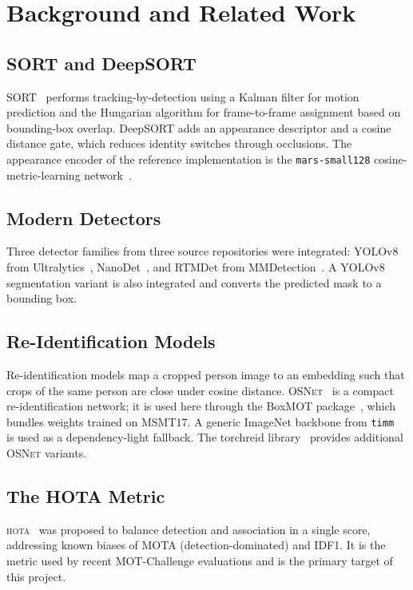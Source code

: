 \documentclass[12pt, a4paper]{article}
\newcommand{\hota}{\textsc{hota}}
\newcommand{\osnet}{\textsc{OSNet}}
\begin{document}
\section{Background and Related Work}
\label{sec:background}

\subsection{SORT and DeepSORT}
SORT~\cite{bewley2016sort} performs tracking-by-detection using a Kalman filter for motion prediction
and the Hungarian algorithm for frame-to-frame assignment based on bounding-box overlap. DeepSORT
\cite{wojke2017deepsort} adds an appearance descriptor and a cosine distance gate, which reduces
identity switches through occlusions. The appearance encoder of the reference implementation is the
\texttt{mars-small128} cosine-metric-learning network~\cite{wojke2018cosine}.

\subsection{Modern Detectors}
Three detector families from three source repositories were integrated: YOLOv8 from
Ultralytics~\cite{jocher2023yolov8}, NanoDet~\cite{rangilyu2021nanodet}, and RTMDet from
MMDetection~\cite{lyu2022rtmdet, mmdetection}. A YOLOv8 segmentation variant is also integrated and
converts the predicted mask to a bounding box.

\subsection{Re-Identification Models}
Re-identification models map a cropped person image to an embedding such that crops of the same
person are close under cosine distance. \osnet{}~\cite{zhou2019osnet} is a compact
re-identification network; it is used here through the BoxMOT package~\cite{brostrom2023boxmot},
which bundles weights trained on MSMT17. A generic ImageNet backbone from
\texttt{timm}~\cite{wightman2019timm} is used as a dependency-light fallback. The torchreid
library~\cite{zhou2021torchreid} provides additional \osnet{} variants.

\subsection{The HOTA Metric}
\hota{}~\cite{luiten2021hota} was proposed to balance detection and association in a single score,
addressing known biases of MOTA (detection-dominated) and IDF1. It is the metric used by recent
MOT-Challenge evaluations and is the primary target of this project.
\end{document}
